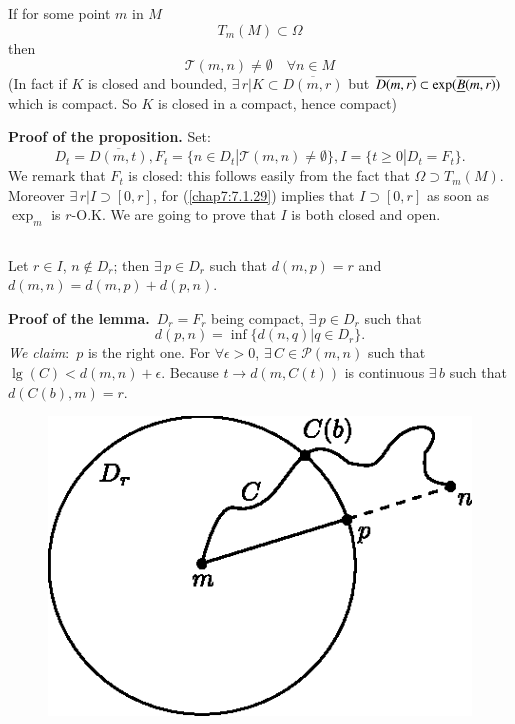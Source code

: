 \begin{prop*}
If for some point $m$ in $M$
$$
T_{m}(M)\subset \Omega
$$
then
$$
\mathscr{T}(m,n)\neq \emptyset\quad\forall n\in M
$$
(In fact if $K$ is closed and bounded, $\exists\, r|K\subset
\overline{D(m,r)}$ but $\overline{D(m,r)}\subset
\exp(\overline{\underline{B}(m,r)})$ which is compact. So $K$ is closed in a
compact, hence compact)
\end{prop*}

\noindent
{\bf Proof of the proposition.} Set:
$$
D_{t}=\overline{D(m,t)}, F_{t}=\{n\in D_{t}|\mathscr{T}(m,n)\neq
\emptyset\}, I=\{t\geq 0|D_{t}=F_{t}\}.
$$
We remark that $F_{t}$ is closed: this follows easily from the fact
that $\Omega\supset T_{m}(M)$. Moreover $\exists\, r|I\supset [0,r]$,
for (\ref{chap7:7.1.29}) implies that $I\supset [0,r]$ as soon as
$\exp_{m}$ is $r$-O.K. We are going to prove that $I$ is both closed
and open.

\subsection{}\label{chap7:7.4.5}


\begin{lemma*}
Let \pageoriginale $r\in I$, $n\not\in D_{r}$; then $\exists\, p\in
D_{r}$ such that $d(m,p)=r$ and $d(m,n)=d(m,p)+d(p,n)$. 
\end{lemma*}

\noindent
{\bf Proof of the lemma.}~$D_{r}=F_{r}$ being compact, $\exists\, p\in
D_{r}$ such that
$$
d(p,n)=\inf\{d(n,q)|q\in D_{r}\}.
$$
{\em We claim}:~$p$ is the right one. For $\forall \epsilon>0$,
$\exists\, C\in\mathscr{P}(m,n)$ such that
$\lg(C)<d(m,n)+\epsilon$. Because $t\to d(m,C(t))$ is continuous
$\exists\, b$ such that $d(C(b),m)=r$.
\begin{figure}[H]
\centering
\includegraphics{figures/chap7-fig7.eps}
\end{figure}

